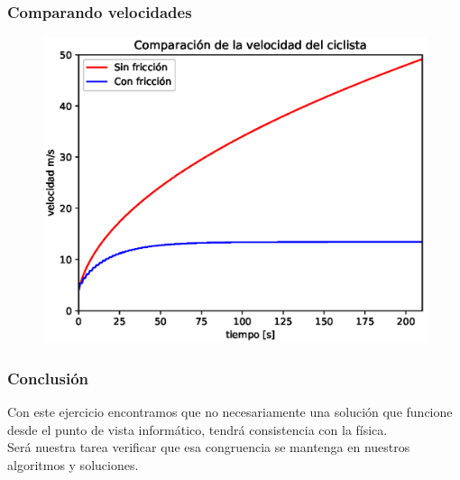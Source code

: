 \begin{frame}
\frametitle{Comparando velocidades}
\begin{figure}
	\centering
	\includegraphics[scale=0.6]{Imagenes/EjerBicicleta02.eps}
\end{figure}
\end{frame}
\begin{frame}
\frametitle{Conclusión}
Con este ejercicio encontramos que no necesariamente una solución que funcione desde el punto de vista informático, tendrá consistencia con la física.
\\
\bigskip
Será nuestra tarea verificar que esa congruencia se mantenga en nuestros algoritmos y soluciones.
\end{frame}
